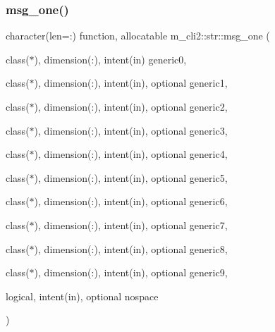 \subsubsection{\texorpdfstring{msg\+\_\+one()}{msg\_one()}}
{\footnotesize\ttfamily character(len=\+:) function, allocatable m\+\_\+cli2\+::str\+::msg\+\_\+one (\begin{DoxyParamCaption}\item[{class($\ast$), dimension(\+:), intent(in)}]{generic0,  }\item[{class($\ast$), dimension(\+:), intent(in), optional}]{generic1,  }\item[{class($\ast$), dimension(\+:), intent(in), optional}]{generic2,  }\item[{class($\ast$), dimension(\+:), intent(in), optional}]{generic3,  }\item[{class($\ast$), dimension(\+:), intent(in), optional}]{generic4,  }\item[{class($\ast$), dimension(\+:), intent(in), optional}]{generic5,  }\item[{class($\ast$), dimension(\+:), intent(in), optional}]{generic6,  }\item[{class($\ast$), dimension(\+:), intent(in), optional}]{generic7,  }\item[{class($\ast$), dimension(\+:), intent(in), optional}]{generic8,  }\item[{class($\ast$), dimension(\+:), intent(in), optional}]{generic9,  }\item[{logical, intent(in), optional}]{nospace }\end{DoxyParamCaption})\hspace{0.3cm}{\ttfamily [private]}}

\mbox{\label{interfacem__cli2_1_1str_a6981d9d92e581945d4528568b6457c29}} 
